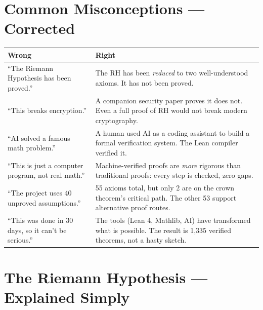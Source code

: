 \documentclass[11pt,a4paper]{article}
\begin{document}
\section{Common Misconceptions --- Corrected}

\begin{center}
\small
\begin{tabular}{@{}p{6cm}p{6.5cm}@{}}
\toprule
\textcolor{wrong}{\textbf{Wrong}} &
\textcolor{correct}{\textbf{Right}} \\
\midrule
``The Riemann Hypothesis has been proved.'' &
The RH has been \emph{reduced} to two well-understood
axioms. It has not been proved. \\[6pt]

``This breaks encryption.'' &
A companion security paper proves it does not. Even
a full proof of RH would not break modern cryptography. \\[6pt]

``AI solved a famous math problem.'' &
A human used AI as a coding assistant to build a formal
verification system. The Lean compiler verified it. \\[6pt]

``This is just a computer program, not real math.'' &
Machine-verified proofs are \emph{more} rigorous than
traditional proofs: every step is checked, zero gaps. \\[6pt]

``The project uses 40 unproved assumptions.'' &
55 axioms total, but only 2 are on the crown theorem's
critical path. The other 53 support alternative proof
routes. \\[6pt]

``This was done in 30 days, so it can't be serious.'' &
The tools (Lean 4, Mathlib, AI) have transformed what
is possible. The result is 1,335 verified theorems, not
a hasty sketch.  \\
\bottomrule
\end{tabular}
\end{center}

\section{The Riemann Hypothesis --- Explained Simply}
\end{document}
